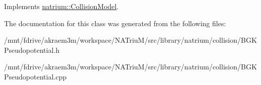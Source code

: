 Implements \hyperlink{classnatrium_1_1CollisionModel_a88b382d63da80e950bc58e8afad769a6}{natrium::CollisionModel}.

The documentation for this class was generated from the following files:\begin{DoxyCompactItemize}
\item 
/mnt/fdrive/akraem3m/workspace/NATriuM/src/library/natrium/collision/BGKPseudopotential.h\item 
/mnt/fdrive/akraem3m/workspace/NATriuM/src/library/natrium/collision/BGKPseudopotential.cpp\end{DoxyCompactItemize}
